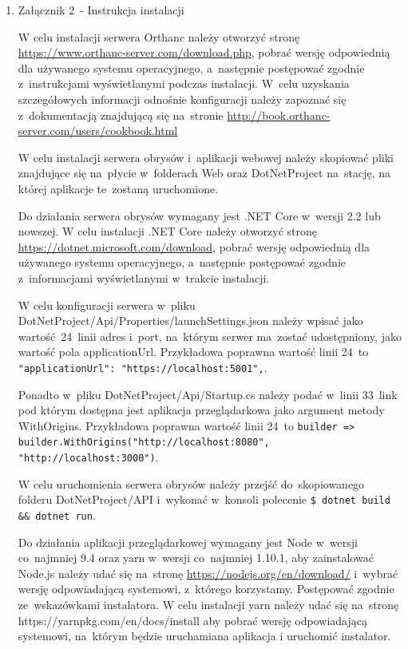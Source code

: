 \documentclass[a4paper,11pt,twoside,openright]{report}
\theoremstyle{definition}
\begin{document}
\begin{enumerate}
\item Załącznik 2~- Instrukcja instalacji

W celu instalacji serwera Orthanc należy otworzyć stronę
\url{https://www.orthanc-server.com/download.php}, pobrać wersję odpowiednią dla
używanego systemu operacyjnego, a~następnie postępować zgodnie z~instrukcjami
wyświetlanymi podczas instalacji. W~celu uzyskania szczegółowych informacji
odnośnie konfiguracji należy zapoznać się z~dokumentacją znajdującą się na~stronie
\url{http://book.orthanc-server.com/users/cookbook.html}

W celu instalacji serwera obrysów i~aplikacji webowej należy skopiować pliki
znajdujące się na~płycie w~folderach Web oraz DotNetProject na~stację,
na której aplikacje te~zostaną uruchomione.

Do działania serwera obrysów wymagany jest .NET Core w~wersji 2.2 lub nowszej.
W celu instalacji .NET Core należy otworzyć stronę \url{https://dotnet.microsoft.com/download},
pobrać wersję odpowiednią dla używanego systemu operacyjnego, a~następnie
postępować zgodnie z~informacjami wyświetlanymi w~trakcie instalacji.

W celu konfiguracji serwera w~pliku DotNetProject/Api/Properties/launchSettings.json
należy wpisać jako wartość~24~linii adres i~port, na~którym serwer ma~zostać
udostępniony, jako wartość pola applicationUrl. Przykładowa poprawna wartość
linii 24~to\texttt{ "applicationUrl": "https://localhost:5001",}.

Ponadto w~pliku DotNetProject/Api/Startup.cs należy podać w~linii 33~link pod
którym dostępna jest aplikacja przeglądarkowa jako argument metody WithOrigins.
Przykładowa poprawna wartość linii 24~to
\texttt{builder => builder.WithOrigins("http://localhost:8080", "http://localhost:3000")}.

W celu uruchomienia serwera obrysów należy przejść do~skopiowanego folderu
DotNetProject/API i~wykonać w~konsoli polecenie \texttt{\$ dotnet build \&\& dotnet run}.

Do działania aplikacji przeglądarkowej wymagany jest Node w~wersji co~najmniej
9.4 oraz yarn w~wersji co~najmniej 1.10.1, aby zainstalować Node.js należy udać
się na~stronę \url{https://nodejs.org/en/download/} i~wybrać wersję odpowiadającą
systemowi, z~którego korzystamy. Postępować zgodnie ze~wskazówkami instalatora.
W celu instalacji yarn należy udać się na~stronę https://yarnpkg.com/en/docs/install
aby pobrać wersję odpowiadającą systemowi, na~którym będzie uruchamiana aplikacja
i uruchomić instalator.


\end{enumerate}
\end{document}
